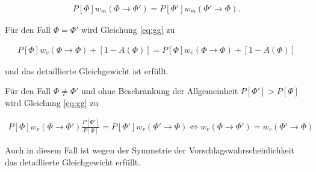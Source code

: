\documentclass[10pt,a4paper]{article}
\begin{document}
\begin{align}\label{eq:gg}
P[\Phi] w_m(\Phi\to\Phi')= P[\Phi']w_m(\Phi'\to\Phi).
\end{align}

Für den Fall $\Phi = \Phi'$ wird Gleichung \ref{eq:gg} zu

\begin{align*}
	P[\Phi] w_v(\Phi\to\Phi) + [1-A(\Phi)] = P[\Phi] w_v(\Phi\to\Phi) + [1-A(\Phi)]
\end{align*}

und das detaillierte Gleichgewicht ist erfüllt.

Für den Fall $\Phi \neq \Phi'$ und ohne Beschränkung der Allgemeinheit $P[\Phi']>P[\Phi]$ wird Gleichung \ref{eq:gg} zu

\begin{align*}
		P[\Phi] w_v(\Phi\to\Phi') \frac{P[\Phi']}{P[\Phi]} = P[\Phi'] w_v(\Phi'\to\Phi)
		\Leftrightarrow w_v(\Phi\to\Phi')=w_v(\Phi'\to\Phi)
\end{align*}

Auch in diesem Fall ist wegen der Symmetrie der Vorschlagswahrscheinlichkeit das detaillierte Gleichgewicht erfüllt.
\end{document}
